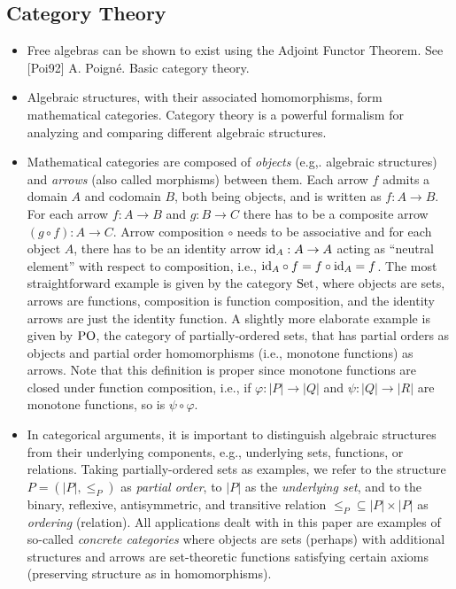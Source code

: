 \subsection{Category Theory}
\begin{itemize}
\item Free algebras can be shown to exist using the Adjoint Functor Theorem. See [Poi92] A. Poigné. Basic category theory.

\item Algebraic structures, with their associated homomorphisms, form mathematical categories. 
Category theory is a powerful formalism for analyzing and comparing different algebraic structures.

\item Mathematical categories are composed of \emph{objects} (e.g,. algebraic structures) and
\emph{arrows} (also called morphisms) between them. Each arrow $f$ admits a domain $A$
and codomain $B$, both being objects, and is written as $f : A \to B$. For each arrow
$f : A \to B$ and $g : B \to C$ there has to be a composite arrow $(g \circ f) : A \to C$.
Arrow composition $\circ$ needs to be associative and for each object $A$, there has to be an identity arrow 
$\idfun{A} : A \to A$ acting as ``neutral element'' with respect to composition, i.e., $\idfun{B} \circ f = f \circ \idfun{A} = f$.
The most straightforward example is given by the category $\setcat$, where objects are sets, arrows are functions, 
composition is function composition, and the identity arrows are just the identity function.
A slightly more elaborate example is given by $\POcat$, the category of partially-ordered sets, that 
has partial orders as objects and partial order homomorphisms (i.e., monotone functions) as arrows.
Note that this definition is proper since monotone functions are closed under function composition, i.e., if $\varphi : |P| \to |Q|$ and 
$\psi : |Q| \to |R|$ are monotone functions, so is $\psi \circ \varphi$.

\item In categorical arguments, it is important to distinguish algebraic structures from their
underlying components, e.g., underlying sets, functions, or relations. Taking
partially-ordered sets as examples, we refer to the structure $P = (|P|, \leq_P)$ as 
\emph{partial order}, to $|P|$ as the \emph{underlying set}, and to the binary, reflexive, antisymmetric, 
and transitive relation $\leq_P {} \subseteq |P| \times |P|$
as \emph{ordering} (relation). All applications dealt with in this paper are examples
of so-called \emph{concrete categories} where objects are sets (perhaps) with additional structures
and arrows are set-theoretic functions satisfying certain axioms (preserving structure as in homomorphisms).


\end{itemize}
